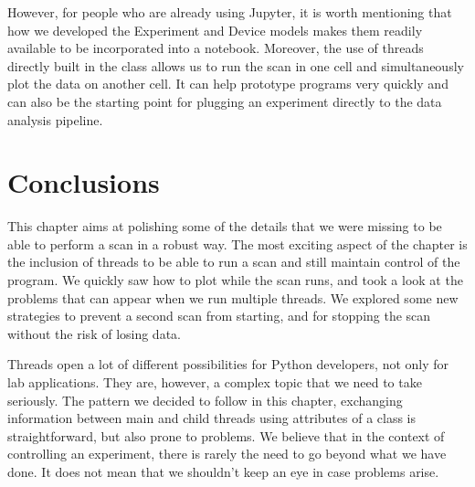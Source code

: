 However, for people who are already using Jupyter, it is worth mentioning that how we developed the Experiment and Device models makes them readily available to be incorporated into a notebook. Moreover, the use of threads directly built in the class allows us to run the scan in one cell and simultaneously plot the data on another cell. It can help prototype programs very quickly and can also be the starting point for plugging an experiment directly to the data analysis pipeline.

\section{Conclusions}\label{sec:conclusions-run-experiment}
This chapter aims at polishing some of the details that we were missing to be able to perform a scan in a robust way. The most exciting aspect of the chapter is the inclusion of threads to be able to run a scan and still maintain control of the program. We quickly saw how to plot while the scan runs, and took a look at the problems that can appear when we run multiple threads. We explored some new strategies to prevent a second scan from starting, and for stopping the scan without the risk of losing data.

Threads open a lot of different possibilities for Python developers, not only for lab applications. They are, however, a complex topic that we need to take seriously. The pattern we decided to follow in this chapter, exchanging information between main and child threads using attributes of a class is straightforward, but also prone to problems. We believe that in the context of controlling an experiment, there is rarely the need to go beyond what we have done. It does not mean that we shouldn't keep an eye in case problems arise.
